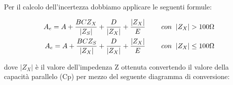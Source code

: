 \begin{table}[ht]
\centering
{}
\caption{LCR, misura della capacità}
\label{tab:lcr_c}
\end{table}
\FloatBarrier

Per il calcolo dell’incertezza dobbiamo applicare le seguenti formule:

\begin{equation}
\begin{split}
        A_e = A + \frac{BCZ_X}{|Z_S|} + \frac{D}{|Z_X|} + \frac{|Z_X|}{E} \hspace{0,8cm} con \hspace{0,2cm} |Z_X| > 100\Omega \\
        A_e = A + \frac{BCZ_S}{|Z_X|} + \frac{D}{|Z_X|} + \frac{|Z_X|}{E} \hspace{0,8cm} con \hspace{0,2cm} |Z_X| \leq 100\Omega
\end{split}
\end{equation}

dove $|Z_X|$ è il valore dell'impedenza Z ottenuta convertendo il valore della capacità parallelo (Cp) per mezzo del seguente diagramma di conversione:

